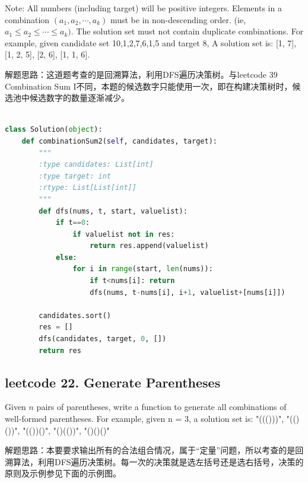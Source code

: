 \documentclass[a4paper,10pt]{article}
\begin{document}
\noindent Note: All numbers (including target) will be positive integers. Elements in a combination $(a_1, a_2, \cdots , a_k)$ must be in non-descending order. (ie, $a_1 \leq a_2 \leq \cdots \leq a_k)$. The solution set must not contain duplicate combinations. For example, given candidate set 10,1,2,7,6,1,5 and target 8, A solution set is: [1, 7], [1, 2, 5], [2, 6], [1, 1, 6].   \\

\begin{CJK*}{UTF8}{gbsn}
\noindent 解题思路：这道题考查的是回溯算法，利用DFS遍历决策树。与leetcode 39 Combination Sum I不同，本题的候选数字只能使用一次，即在构建决策树时，候选池中候选数字的数量逐渐减少。\\
\end{CJK*}

\begin{lstlisting}[language=Python, caption=Problem40. Combination Sum II]

class Solution(object):
    def combinationSum2(self, candidates, target):
        """
        :type candidates: List[int]
        :type target: int
        :rtype: List[List[int]]
        """
        def dfs(nums, t, start, valuelist):
            if t==0:
                if valuelist not in res:
                    return res.append(valuelist)
            else:
                for i in range(start, len(nums)):
                    if t<nums[i]: return
                    dfs(nums, t-nums[i], i+1, valuelist+[nums[i]])
        
        candidates.sort()
        res = []
        dfs(candidates, target, 0, [])
        return res
\end{lstlisting}


\subsection{leetcode 22. Generate Parentheses}
Given $n$ pairs of parentheses, write a function to generate all combinations of well-formed parentheses. For example, given n = 3, a solution set is: "((()))", "(()())", "(())()", "()(())", "()()()"   \\

\begin{CJK*}{UTF8}{gbsn}
\noindent 解题思路：本要要求输出所有的合法组合情况，属于“定量”问题，所以考查的是回溯算法，利用DFS遍历决策树。每一次的决策就是选左括号还是选右括号，决策的原则及示例参见下面的示例图。
\end{CJK*}
\end{document}

